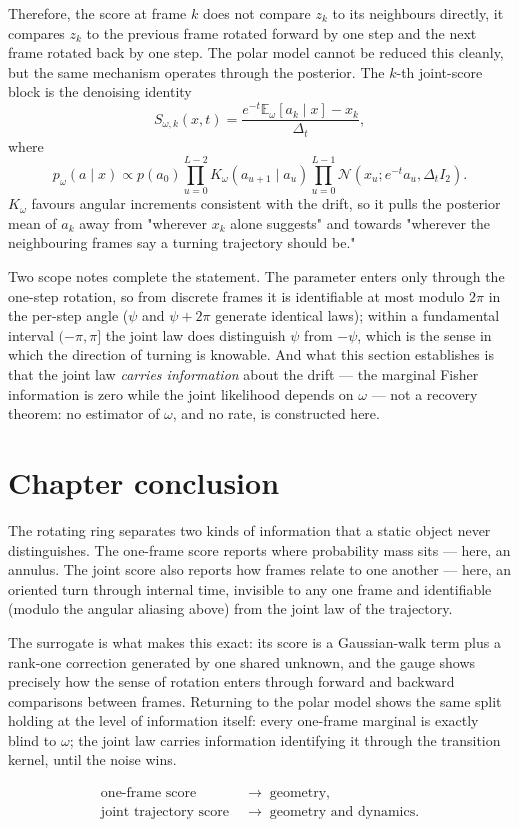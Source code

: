 Therefore, the score at frame $k$ does not compare $z_k$ to
its neighbours directly, it compares $z_k$ to the previous frame rotated
forward by one step and the next frame rotated back by one step.
The polar model cannot be reduced this cleanly, but the same mechanism
operates through the posterior. The $k$-th joint-score block is the
denoising identity
\begin{equation}
  S_{\omega,k}(x,t)
  =\frac{e^{-t}\mathbb E_\omega[a_k\mid x]-x_k}{\Delta_t},
  \label{eq:ring-polar-denoising-score}
\end{equation}
where
\begin{equation}
  p_\omega(a\mid x)
  \propto
  p(a_0)
  \prod_{u=0}^{L-2}K_\omega(a_{u+1}\mid a_u)
  \prod_{u=0}^{L-1}
  \mathcal N(x_u;e^{-t}a_u,\Delta_t I_2).
  \label{eq:ring-polar-posterior}
\end{equation}
$K_\omega$ favours angular increments consistent with the drift, so it pulls
the posterior mean of $a_k$ away from "wherever $x_k$ alone suggests" and
towards "wherever the neighbouring frames say a turning trajectory should
be."

Two scope notes complete the statement. The parameter enters only through the
one-step rotation, so from discrete frames it is identifiable at most modulo
$2\pi$ in the per-step angle ($\psi$ and $\psi + 2\pi$ generate identical
laws); within a fundamental interval $(-\pi, \pi]$ the joint law does
distinguish $\psi$ from $-\psi$, which is the sense in which the direction of
turning is knowable. And what this section establishes is that the joint law
\emph{carries information} about the drift --- the marginal Fisher information
is zero while the joint likelihood depends on $\omega$ --- not a recovery
theorem: no estimator of $\omega$, and no rate, is constructed here.

\section{Chapter conclusion}
\label{sec:ring-conclusion}

The rotating ring separates two kinds of information that a static object
never distinguishes. The one-frame score reports where probability mass
sits --- here, an annulus. The joint score also reports how frames relate
to one another --- here, an oriented turn through internal time, invisible
to any one frame and identifiable (modulo the angular aliasing above) from the
joint law of the trajectory.

The surrogate is what makes this exact: its
score is a Gaussian-walk term plus a rank-one correction generated by one
shared unknown, and the gauge shows precisely how the sense of rotation
enters through forward and backward comparisons between frames. Returning
to the polar model shows the same split holding at the level of information
itself: every one-frame marginal is exactly blind to $\omega$; the joint
law carries information identifying it through the transition kernel, until
the noise wins.

\begin{equation}
  \boxed{
  \begin{aligned}
    \text{one-frame score}
      &\;\longrightarrow\;\text{geometry},\\
    \text{joint trajectory score}
      &\;\longrightarrow\;\text{geometry and dynamics}.
  \end{aligned}}
  \label{eq:ring-chapter-message}
\end{equation}